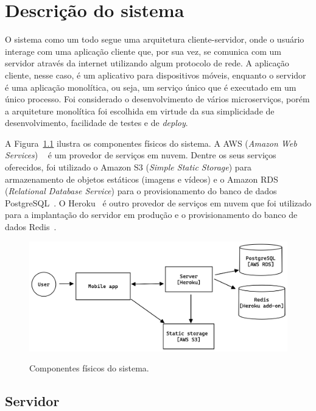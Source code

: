 \chapter{Descrição do sistema}
\label{c.descricao-do-sistema}

O sistema como um todo segue uma arquitetura cliente-servidor, onde o usuário interage com uma aplicação cliente que, por sua vez, se comunica com um servidor através da internet utilizando algum protocolo de rede. A aplicação cliente, nesse caso, é um aplicativo para dispositivos móveis, enquanto o servidor é uma aplicação monolítica, ou seja, um serviço único que é executado em um único processo. Foi considerado o desenvolvimento de vários microserviços, porém a arquiteture monolítica foi escolhida em virtude da sua simplicidade de desenvolvimento, facilidade de testes e de \emph{deploy}. 

A Figura~\ref{f.system} ilustra os componentes físicos do sistema. A AWS (\emph{Amazon Web Services}) ~\cite{aws} é um provedor de serviços em nuvem. Dentre os seus serviços oferecidos, foi utilizado o Amazon S3 (\emph{Simple Static Storage}) para armazenamento de objetos estáticos (imagens e vídeos) e o Amazon RDS (\emph{Relational Database Service}) para o provisionamento do banco de dados PostgreSQL~\cite{postgresql}. O Heroku~\cite{heroku} é outro provedor de serviços em nuvem que foi utilizado para a implantação do servidor em produção e o provisionamento do banco de dados Redis~\cite{redis}.

\begin{figure}[htbp]
	\caption{\small Componentes físicos do sistema.}
	\centering
	\includegraphics[width=\textwidth]{../diagrams/out/system.png}
	\label{f.system}
\end{figure}

\FloatBarrier

\section{Servidor}

